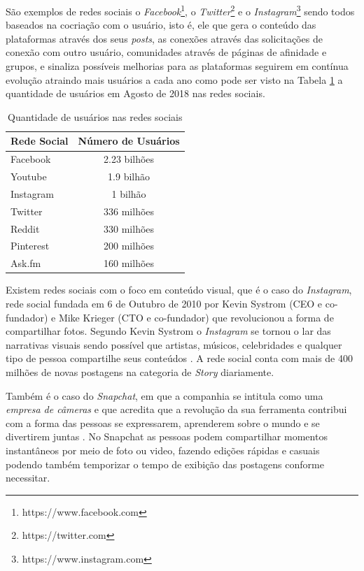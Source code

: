 São exemplos de redes sociais o \textit{Facebook}\footnote{https://www.facebook.com}, o \textit{Twitter}\footnote{https://twitter.com} e o \textit{Instagram}\footnote{https://www.instagram.com} sendo todos baseados na cocriação com o usuário, isto é, ele que gera o conteúdo das plataformas através dos seus \textit{posts}, as conexões através das solicitações de conexão com outro usuário, comunidades através de páginas de afinidade e grupos, e sinaliza possíveis melhorias para as plataformas seguirem em contínua evolução atraindo mais usuários a cada ano como pode ser visto na Tabela \ref{tab:qtdusers} a quantidade de usuários em Agosto de 2018 nas redes sociais.


\begin{table}[h]
\centering
\caption{Quantidade de usuários nas redes sociais}
\label{tab:qtdusers}
\begin{tabular}{|l|c|}
\hline
\textbf{Rede Social}&  \textbf{Número de Usuários} \\ \hline
Facebook     &     2.23 bilhões   \\ \hline
Youtube      &     1.9  bilhão    \\ \hline
Instagram    &     1    bilhão    \\ \hline
Twitter      &     336  milhões   \\ \hline
Reddit       &     330  milhões    \\ \hline
Pinterest    &     200  milhões    \\ \hline
Ask.fm       &     160  milhões    \\ \hline
\end{tabular}
\end{table}

Existem redes sociais com o foco em conteúdo visual, que é o caso do \textit{Instagram}, rede social fundada em 6 de Outubro de 2010 por Kevin Systrom (CEO e co-fundador) e Mike Krieger (CTO e co-fundador) que revolucionou a forma de compartilhar fotos. Segundo Kevin Systrom o \textit{Instagram} se tornou o lar das narrativas visuais sendo possível que artistas, músicos, celebridades e qualquer tipo de pessoa compartilhe seus conteúdos \cite{instagram_2018}. A rede social conta com mais de 400 milhões de novas postagens na categoria de \textit{Story} diariamente. 

Também é o caso do \textit{Snapchat}, em que a companhia se intitula como uma \textit{empresa de câmeras} e que acredita que a revolução da sua ferramenta contribui com a forma das pessoas se expressarem, aprenderem sobre o mundo e se divertirem juntas \cite{snapchat_2018}. No Snapchat as pessoas podem compartilhar momentos instantâneos por meio de foto ou video, fazendo edições rápidas e casuais podendo também temporizar o tempo de exibição das postagens conforme necessitar.

